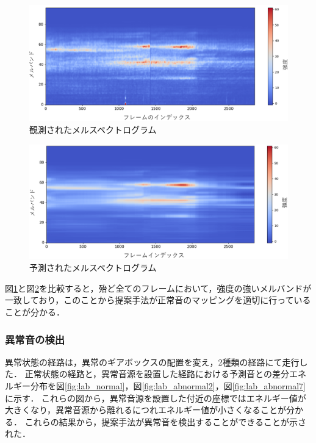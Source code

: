 \documentclass[../main]{subfiles}
\begin{document}
\begin{figure}[t]
  \centering
  \includegraphics[keepaspectratio, width=0.7\linewidth]{chap4/observed_mel.png}
  \caption{観測されたメルスペクトログラム}
  \label{fig:observed_mel}
\end{figure}

\begin{figure}[t]
  \centering
  \includegraphics[keepaspectratio, width=0.7\linewidth]{chap4/predicted_mel.png}
  \caption{予測されたメルスペクトログラム}
  \label{fig:predicted_mel}
\end{figure}
図\ref{fig:observed_mel}と図\ref{fig:predicted_mel}を比較すると，殆ど全てのフレームにおいて，強度の強いメルバンドが一致しており，このことから提案手法が正常音のマッピングを適切に行っていることが分かる．

\subsubsection{異常音の検出} \label{subsubsec:anomaly_detection}
異常状態の経路は，異常のギアボックスの配置を変え，2種類の経路にて走行した．
正常状態の経路と，異常音源を設置した経路における予測音との差分エネルギー分布を図\ref{fig:lab_normal}，図\ref{fig:lab_abnormal2}，図\ref{fig:lab_abnormal7}に示す．
これらの図から，異常音源を設置した付近の座標ではエネルギー値が大きくなり，異常音源から離れるにつれエネルギー値が小さくなることが分かる．
これらの結果から，提案手法が異常音を検出することができることが示された．
\end{document}

